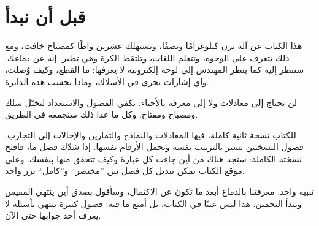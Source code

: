 \chapter*{قبل أن نبدأ}

هذا الكتاب عن آلة تزن كيلوغرامًا ونصفًا، وتستهلك عشرين واطًا كمصباح خافت، ومع ذلك تتعرف على الوجوه، وتتعلم اللغات، وتلتقط الكرة وهي تطير. إنه عن دماغك. سننظر إليه كما ينظر المهندس إلى لوحة إلكترونية لا يعرفها: ما القطع، وكيف وُصلت، وأي إشارات تجري في الأسلاك، وماذا تحسب هذه الدائرة.

لن تحتاج إلى معادلات ولا إلى معرفة بالأحياء. يكفي الفضول والاستعداد لتخيّل سلك ومصباح ومفتاح. وكل ما عدا ذلك سنجمعه في الطريق.

للكتاب نسخة ثانية كاملة، فيها المعادلات والنماذج والتمارين والإحالات إلى التجارب. فصول النسختين تسير بالترتيب نفسه وتحمل الأرقام نفسها. إذا شدّك فصل ما، فافتح نسخته الكاملة: ستجد هناك من أين جاءت كل عبارة وكيف تتحقق منها بنفسك. وعلى موقع الكتاب يمكن تبديل كل فصل بين ”مختصر“ و”كامل“ بزر واحد.

تنبيه واحد. معرفتنا بالدماغ أبعد ما تكون عن الاكتمال، وسأقول بصدق أين ينتهي المقيس ويبدأ التخمين. هذا ليس عيبًا في الكتاب، بل أمتع ما فيه: فصول كثيرة تنتهي بأسئلة لا يعرف أحد جوابها حتى الآن.
